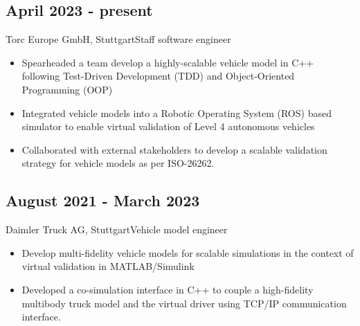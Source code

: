 \documentclass{mycv}
\begin{document}
\begin{paracol}{2}
{\begin{itemize}
           \end{itemize}
}
{
    \subsection{April 2023 - present}{Torc Europe GmbH, Stuttgart}{Staff software engineer}
          \begin{itemize}
            \item Spearheaded a team develop a highly-scalable
                vehicle model in C++ following Test-Driven Development
                (TDD) and Object-Oriented Programming (OOP)
            \item Integrated vehicle models into a Robotic Operating System (ROS)
                based simulator to enable virtual validation of Level 4
                autonomous vehicles
            \item 
                Collaborated with external stakeholders to develop a scalable
                validation strategy for vehicle models as per
                ISO-26262.


          \end{itemize}
    
    \subsection{August 2021 - March 2023}{Daimler Truck AG, Stuttgart}{Vehicle model engineer}
          \begin{itemize}
              \item Develop multi-fidelity vehicle models for scalable simulations in the context of
          virtual validation in MATLAB/Simulink

            \item Developed a co-simulation interface in C++ to couple a high-fidelity
                multibody truck model and the virtual driver using
                TCP/IP communication interface.

          \end{itemize}
}
\end{paracol}
\end{document}
